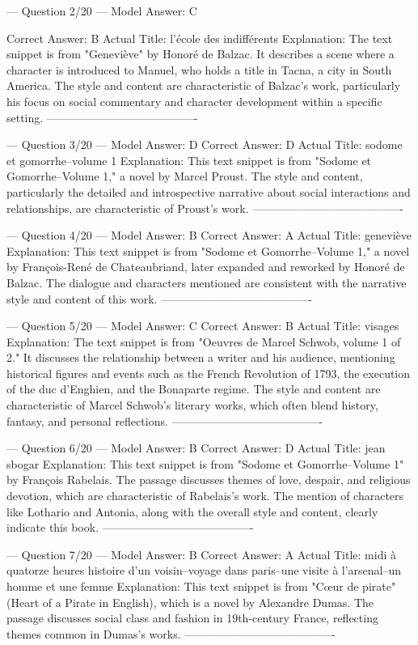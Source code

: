 \documentclass[11pt]{article}
\begin{document}
{--- Question 2/20 ---
Model Answer:    C

Correct Answer:  B
Actual Title:    l'école des indifférents
Explanation:     The text snippet is from "Geneviève" by Honoré de Balzac. It describes a scene where a character is introduced to Manuel, who holds a title in Tacna, a city in South America. The style and content are characteristic of Balzac's work, particularly his focus on social commentary and character development within a specific setting.
----------------------------------------

--- Question 3/20 ---
Model Answer:    D
Correct Answer:  D
Actual Title:    sodome et gomorrhe--volume 1
Explanation:     This text snippet is from "Sodome et Gomorrhe--Volume 1," a novel by Marcel Proust. The style and content, particularly the detailed and introspective narrative about social interactions and relationships, are characteristic of Proust's work.
----------------------------------------

--- Question 4/20 ---
Model Answer:    B
Correct Answer:  A
Actual Title:    geneviève
Explanation:     This text snippet is from "Sodome et Gomorrhe--Volume 1," a novel by François-René de Chateaubriand, later expanded and reworked by Honoré de Balzac. The dialogue and characters mentioned are consistent with the narrative style and content of this work.
----------------------------------------

--- Question 5/20 ---
Model Answer:    C
Correct Answer:  B
Actual Title:    visages
Explanation:     The text snippet is from "Oeuvres de Marcel Schwob, volume 1 of 2." It discusses the relationship between a writer and his audience, mentioning historical figures and events such as the French Revolution of 1793, the execution of the duc d'Enghien, and the Bonaparte regime. The style and content are characteristic of Marcel Schwob's literary works, which often blend history, fantasy, and personal reflections.
----------------------------------------

--- Question 6/20 ---
Model Answer:    B
Correct Answer:  D
Actual Title:    jean sbogar
Explanation:     This text snippet is from "Sodome et Gomorrhe--Volume 1" by François Rabelais. The passage discusses themes of love, despair, and religious devotion, which are characteristic of Rabelais's work. The mention of characters like Lothario and Antonia, along with the overall style and content, clearly indicate this book.
----------------------------------------

--- Question 7/20 ---
Model Answer:    B
Correct Answer:  A
Actual Title:    midi à quatorze heures histoire d'un voisin--voyage dans paris--une visite à l'arsenal--un homme et une femme
Explanation:     This text snippet is from "Cœur de pirate" (Heart of a Pirate in English), which is a novel by Alexandre Dumas. The passage discusses social class and fashion in 19th-century France, reflecting themes common in Dumas's works.
----------------------------------------

}
\end{document}
